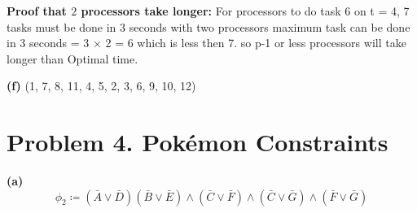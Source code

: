 \documentclass{article}
\begin{document}
\vspace{1em}

\textbf{Proof that $2$ processors take longer:} For processors to do task 6 on t = 4, 7 tasks must be done in 3 seconds
with two processors maximum task can be done in 3 seconds = 3 $\times$ 2 = 6 which is less then 7. so p-1 or less processors will take longer than
Optimal time.

\vspace{\baselineskip}
\noindent\textbf{(f)} (1, 7, 8, 11, 4, 5, 2, 3, 6, 9, 10, 12)

\section*{Problem 4. Pok\'emon Constraints}

\textbf{(a)}
\[\phi_2 \coloneq \left( \bar{A} \lor \bar{D} \right) \left( \bar{B} \lor \bar{E} \right) \land \left( \bar{C} \lor \bar{F} \right) \land
\left( \bar{C} \lor \bar{G} \right) \land \left( \bar{F} \lor \bar{G} \right)\]
\end{document}
